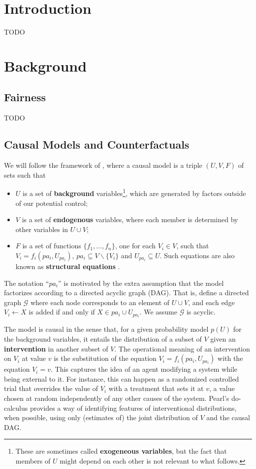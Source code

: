 \documentclass{article}
\begin{document}
\section{Introduction}
\label{introduction}

TODO

\section{Background}
\label{background}

\subsection{Fairness}

TODO

\subsection{Causal Models and Counterfactuals}

We will follow the framework of \cite{pearl:00}, where a causal
model is a triple $(U, V, F)$ of sets such that
\begin{itemize}
\item $U$ is a set of {\bf background} variables\footnote{These are
  sometimes called {\bf exogeneous variables}, but the fact that members of $U$
  might depend on each other is not relevant to what follows.}, which are generated by factors
outside of our potential control;
\item $V$ is a set of {\bf endogenous} variables, where each member is determined by
  other variables in $U \cup V$;
\item $F$ is a set of functions $\{f_1, \dots, f_n\}$, one for each $V_i \in V$, such
that $V_i = f_i(pa_i, U_{pa_i})$, $pa_i \subseteq V \backslash
\{V_i\}$ and $U_{pa_i} \subseteq U$. Such equations are also known as
{\bf structural equations} \citep{bol:89}.
\end{itemize}

The notation ``$pa_i$'' is motivated by the extra assumption that the
model factorizes according to a directed acyclic graph (DAG). That is,
define a directed graph $\mathcal G$ where each node corresponds to an
element of $U \cup V$, and each edge $V_i \leftarrow X$ is added if
and only if $X \in pa_i \cup U_{pa_i}$. We assume $\mathcal G$ is
acyclic.

The model is causal in the sense that, for a given probability model
$p(U)$ for the background variables, it entails the distribution of a
subset of $V$ given an {\bf intervention} in another subset of $V$.
The operational meaning of an intervention on $V_i$ at value $v$ is
the substitution of the equation $V_i = f_i(pa_i, U_{pa_i})$ with the
equation $V_i = v$. This captures the idea of an agent modifying a
system while being external to it. For instance, this can happen as a
randomized controlled trial that overrides the value of $V_i$ with a
treatment that sets it at $v$, a value chosen at random independently
of any other causes of the system. Pearl's do-calculus
\citep{pearl:00} provides a way of identifying features of 
interventional distributions, when possible, using only (estimates of) the joint
distribution of $V$ and the causal DAG.
\end{document}
